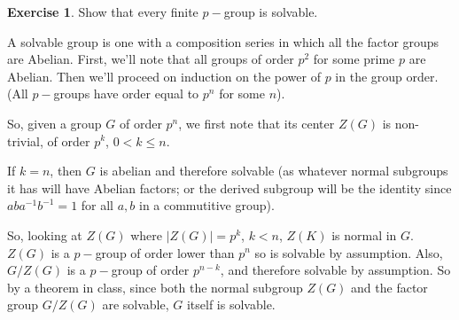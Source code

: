 \documentclass[11pt,oneside]{article}
\numberwithin{equation}{section}
\theoremstyle{definition}
\newtheorem{exercise}{Exercise}
\begin{document}
\begin{exercise}
  Show that every finite $p-$group is solvable.
\end{exercise}

\begin{solution}
  A solvable group is one with a composition series in which all the
  factor groups are Abelian.  First, we'll note that all groups of
  order $p^2$ for some prime $p$ are Abelian. Then we'll proceed on
  induction on the power of $p$ in the group order.  (All $p-$groups
  have order equal to $p^n$ for some $n$).
  
  So, given a group $G$ of order $p^n$, we first note that its
  center $Z(G)$ is non-trivial, of order $p^k$, $0 < k \leq n$.
  
  If $k = n$, then $G$ is abelian and therefore solvable (as
  whatever normal subgroups it has will have Abelian factors; or the
  derived subgroup will be the identity since
  $a b a^{-1} b^{-1} = 1$ for all $a, b$ in a commutitive group).
  
  So, looking at $Z(G)$ where $|Z(G)| = p^k$, $k < n$, $Z(K)$ is
  normal in $G$.  $Z(G)$ is a $p-$group of order lower than $p^n$ so
  is solvable by assumption.  Also, $G / Z(G)$ is a $p-$group of
  order $p ^ { n - k}$, and therefore solvable by assumption. So by
  a theorem in class, since both the normal subgroup $Z(G)$ and the
  factor group $G/Z(G)$ are solvable, $G$ itself is solvable.
  
\end{solution}
\end{document}
